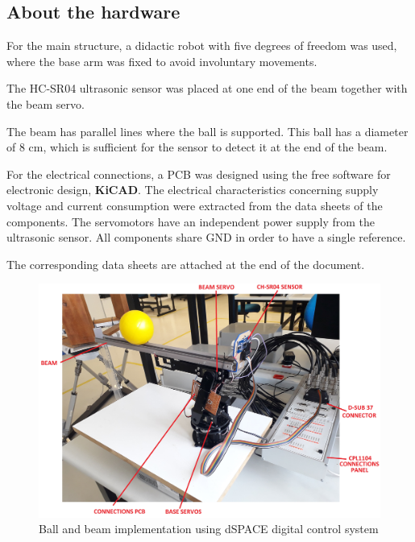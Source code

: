 \subsection{About the hardware}
For the main structure, a didactic robot with five degrees of freedom was used, where the base arm was fixed to avoid involuntary movements.\par
The HC-SR04 ultrasonic sensor was placed at one end of the beam together with the beam servo.\par
The beam has parallel lines where the ball is supported. This ball has a diameter of 8 cm, which is sufficient for the sensor to detect it at the end of the beam.\par
For the electrical connections, a PCB was designed using the free software for electronic design, \textbf{KiCAD}. The electrical characteristics concerning supply voltage and current consumption were extracted from the data sheets of the components. The servomotors have an independent power supply from the ultrasonic sensor. All components share GND in order to have a single reference.\par
The corresponding data sheets are attached at the end of the document.
    \begin{figure}[H]
        \centering
        \includegraphics[width=\textwidth]{Images/Ball and Bean/Hardware/Parts.jpg}
        \caption{Ball and beam implementation using dSPACE digital control system}
        \label{fig41}
    \end{figure}
    
